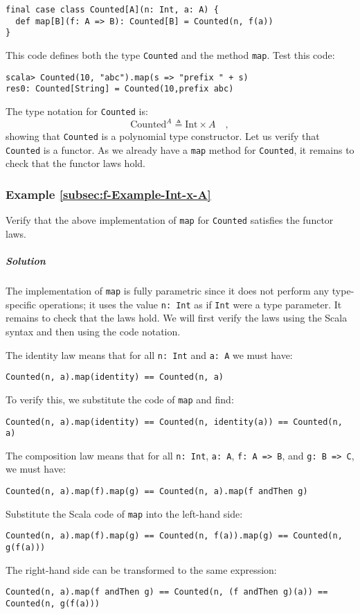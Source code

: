 \begin{lstlisting}
final case class Counted[A](n: Int, a: A) {
  def map[B](f: A => B): Counted[B] = Counted(n, f(a))
}
\end{lstlisting}
This code defines both the type \lstinline!Counted! and the method
\lstinline!map!. Test this code:
\begin{lstlisting}
scala> Counted(10, "abc").map(s => "prefix " + s)
res0: Counted[String] = Counted(10,prefix abc) 
\end{lstlisting}

The type notation for \lstinline!Counted! is:
\[
\text{Counted}^{A}\triangleq\text{Int}\times A\quad,
\]
showing that \lstinline!Counted! is a polynomial type constructor.
Let us verify that \lstinline!Counted! is a functor. As we already
have a \lstinline!map! method for \lstinline!Counted!, it remains
to check that the functor laws hold.

\subsubsection{Example \label{subsec:f-Example-Int-x-A}\ref{subsec:f-Example-Int-x-A}}

Verify that the above implementation of \lstinline!map! for \lstinline!Counted!
satisfies the functor laws. 

\subparagraph{Solution}

The implementation of \lstinline!map! is fully parametric since it
does not perform any type-specific operations; it uses the value \lstinline!n: Int!
as if \lstinline!Int! were a type parameter. It remains to check
that the laws hold. We will first verify the laws using the Scala
syntax and then using the code notation.

The identity law means that for all \lstinline!n: Int! and \lstinline!a: A!
we must have:
\begin{lstlisting}
Counted(n, a).map(identity) == Counted(n, a)
\end{lstlisting}
To verify this, we substitute the code of \lstinline!map! and find:
\begin{lstlisting}
Counted(n, a).map(identity) == Counted(n, identity(a)) == Counted(n, a)
\end{lstlisting}

The composition law means that for all \lstinline!n: Int!, \lstinline!a: A!,
\lstinline!f: A => B!, and \lstinline!g: B => C!, we must have:
\begin{lstlisting}
Counted(n, a).map(f).map(g) == Counted(n, a).map(f andThen g)
\end{lstlisting}
Substitute the Scala code of \lstinline!map! into the left-hand side:
\begin{lstlisting}
Counted(n, a).map(f).map(g) == Counted(n, f(a)).map(g) == Counted(n, g(f(a)))
\end{lstlisting}
The right-hand side can be transformed to the same expression:
\begin{lstlisting}
Counted(n, a).map(f andThen g) == Counted(n, (f andThen g)(a)) == Counted(n, g(f(a)))
\end{lstlisting}

